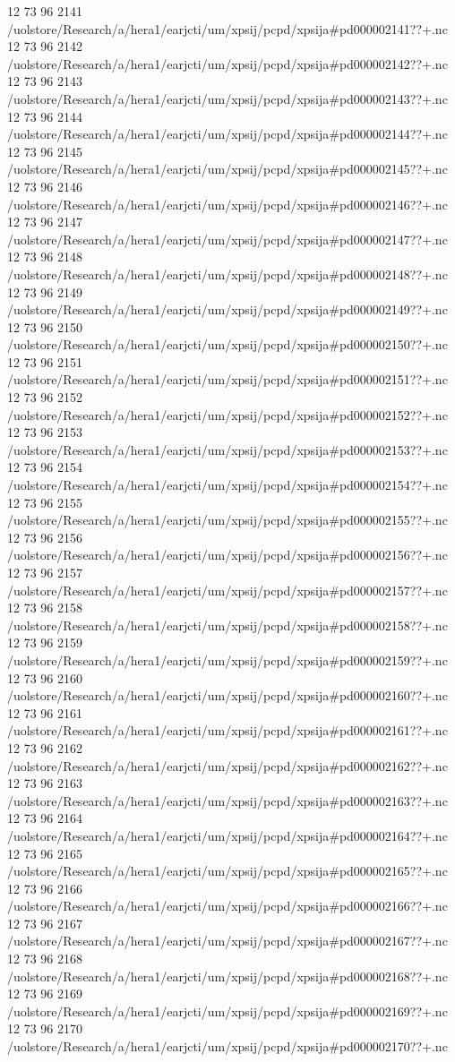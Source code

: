 12 73 96
2141
/uolstore/Research/a/hera1/earjcti/um/xpsij/pcpd/xpsija#pd000002141??+.nc
12 73 96
2142
/uolstore/Research/a/hera1/earjcti/um/xpsij/pcpd/xpsija#pd000002142??+.nc
12 73 96
2143
/uolstore/Research/a/hera1/earjcti/um/xpsij/pcpd/xpsija#pd000002143??+.nc
12 73 96
2144
/uolstore/Research/a/hera1/earjcti/um/xpsij/pcpd/xpsija#pd000002144??+.nc
12 73 96
2145
/uolstore/Research/a/hera1/earjcti/um/xpsij/pcpd/xpsija#pd000002145??+.nc
12 73 96
2146
/uolstore/Research/a/hera1/earjcti/um/xpsij/pcpd/xpsija#pd000002146??+.nc
12 73 96
2147
/uolstore/Research/a/hera1/earjcti/um/xpsij/pcpd/xpsija#pd000002147??+.nc
12 73 96
2148
/uolstore/Research/a/hera1/earjcti/um/xpsij/pcpd/xpsija#pd000002148??+.nc
12 73 96
2149
/uolstore/Research/a/hera1/earjcti/um/xpsij/pcpd/xpsija#pd000002149??+.nc
12 73 96
2150
/uolstore/Research/a/hera1/earjcti/um/xpsij/pcpd/xpsija#pd000002150??+.nc
12 73 96
2151
/uolstore/Research/a/hera1/earjcti/um/xpsij/pcpd/xpsija#pd000002151??+.nc
12 73 96
2152
/uolstore/Research/a/hera1/earjcti/um/xpsij/pcpd/xpsija#pd000002152??+.nc
12 73 96
2153
/uolstore/Research/a/hera1/earjcti/um/xpsij/pcpd/xpsija#pd000002153??+.nc
12 73 96
2154
/uolstore/Research/a/hera1/earjcti/um/xpsij/pcpd/xpsija#pd000002154??+.nc
12 73 96
2155
/uolstore/Research/a/hera1/earjcti/um/xpsij/pcpd/xpsija#pd000002155??+.nc
12 73 96
2156
/uolstore/Research/a/hera1/earjcti/um/xpsij/pcpd/xpsija#pd000002156??+.nc
12 73 96
2157
/uolstore/Research/a/hera1/earjcti/um/xpsij/pcpd/xpsija#pd000002157??+.nc
12 73 96
2158
/uolstore/Research/a/hera1/earjcti/um/xpsij/pcpd/xpsija#pd000002158??+.nc
12 73 96
2159
/uolstore/Research/a/hera1/earjcti/um/xpsij/pcpd/xpsija#pd000002159??+.nc
12 73 96
2160
/uolstore/Research/a/hera1/earjcti/um/xpsij/pcpd/xpsija#pd000002160??+.nc
12 73 96
2161
/uolstore/Research/a/hera1/earjcti/um/xpsij/pcpd/xpsija#pd000002161??+.nc
12 73 96
2162
/uolstore/Research/a/hera1/earjcti/um/xpsij/pcpd/xpsija#pd000002162??+.nc
12 73 96
2163
/uolstore/Research/a/hera1/earjcti/um/xpsij/pcpd/xpsija#pd000002163??+.nc
12 73 96
2164
/uolstore/Research/a/hera1/earjcti/um/xpsij/pcpd/xpsija#pd000002164??+.nc
12 73 96
2165
/uolstore/Research/a/hera1/earjcti/um/xpsij/pcpd/xpsija#pd000002165??+.nc
12 73 96
2166
/uolstore/Research/a/hera1/earjcti/um/xpsij/pcpd/xpsija#pd000002166??+.nc
12 73 96
2167
/uolstore/Research/a/hera1/earjcti/um/xpsij/pcpd/xpsija#pd000002167??+.nc
12 73 96
2168
/uolstore/Research/a/hera1/earjcti/um/xpsij/pcpd/xpsija#pd000002168??+.nc
12 73 96
2169
/uolstore/Research/a/hera1/earjcti/um/xpsij/pcpd/xpsija#pd000002169??+.nc
12 73 96
2170
/uolstore/Research/a/hera1/earjcti/um/xpsij/pcpd/xpsija#pd000002170??+.nc
